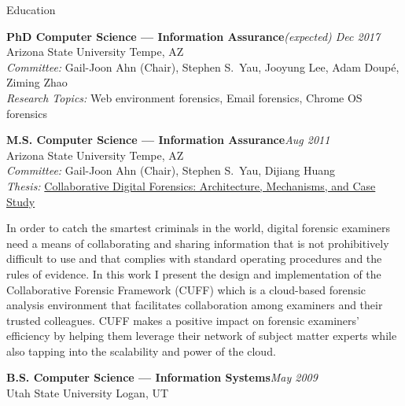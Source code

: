 

\begin{rSection}{Education}

\textbf{PhD Computer Science --- Information Assurance}\hfill \emph{(expected) Dec 2017}\\
Arizona State University \hfill {Tempe, AZ}\\
\textit{Committee:} Gail-Joon Ahn (Chair), Stephen S.\ Yau, Jooyung Lee, Adam Doup\'{e}, Ziming Zhao\\
\textit{Research Topics:} Web environment forensics, Email forensics, Chrome OS forensics

\textbf{M.S. Computer Science --- Information Assurance}\hfill \emph{Aug 2011}\\
Arizona State University \hfill {Tempe, AZ}\\
\textit{Committee:} Gail-Joon Ahn (Chair), Stephen S.\ Yau, Dijiang Huang\\
\textit{Thesis:} \href{http://repository.asu.edu/attachments/56996/content/Mabey_asu_0010N_10959.pdf}{Collaborative Digital Forensics: Architecture, Mechanisms, and Case Study}\begin{CVonly}
\begin{quoting}
  In order to catch the smartest criminals in the world, digital forensic examiners need a means of collaborating and sharing information that is not prohibitively difficult to use and that complies with standard operating procedures and the rules of evidence. In this work I present the design and implementation of the Collaborative Forensic Framework (CUFF) which is a cloud-based forensic analysis environment that facilitates collaboration among examiners and their trusted colleagues. CUFF makes a positive impact on forensic examiners' efficiency by helping them leverage their network of subject matter experts while also tapping into the scalability and power of the cloud.
\end{quoting}\end{CVonly}

\textbf{B.S. Computer Science --- Information Systems}\hfill \emph{May 2009}\\
Utah State University \hfill {Logan, UT}

\end{rSection}
